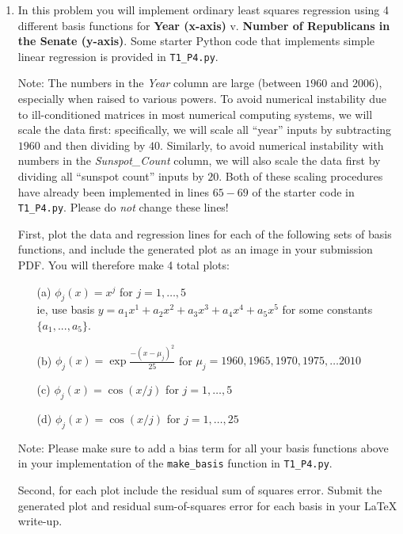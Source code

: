 \documentclass[submit]{harvardml}
\begin{document}
\begin{problem}
\begin{enumerate}
\item In this problem you will implement ordinary least squares
  regression using 4 different basis functions for \textbf{Year
    (x-axis)} v. \textbf{Number of Republicans in the Senate
    (y-axis)}. Some starter Python code that implements simple linear
  regression is provided in \verb|T1_P4.py|.

  Note: The numbers in the \emph{Year} column are large (between $1960$ and $2006$), especially when raised to various powers. To avoid numerical instability due to ill-conditioned matrices in most numerical computing systems, we will scale the data first: specifically, we will scale all ``year'' inputs by subtracting $1960$ and then dividing by $40$. Similarly, to avoid numerical instability with numbers in the \emph{Sunspot\_Count} column, we will also scale the data first by dividing all ``sunspot count'' inputs by $20$. Both of these scaling procedures have already been implemented in lines $65-69$ of the starter code in \verb|T1_P4.py|. Please do \emph{not} change these lines!

First, plot the data and regression lines for each of the following sets of basis functions, and include
the generated plot as an image in your submission PDF. You will therefore make 4 total plots:
\begin{enumerate}
	\item[(a)] $\phi_j(x) = x^j$ for $j=1, \ldots, 5$\\
    ie, use basis $y = a_1 x^1 + a_2 x^2 + a_3 x^3 + a_4 x^4 + a_5 x^5$ for some constants $\{a_1, ..., a_5\}$. 
    \item[(b)] $\phi_j(x) = \exp{\frac{-(x-\mu_j)^2}{25}}$ for $\mu_j=1960, 1965, 1970, 1975, \ldots 2010$
	\item[(c)] $\phi_j(x) = \cos(x / j)$ for $j=1, \ldots, 5$
	\item[(d)] $\phi_j(x) = \cos(x / j)$ for $j=1, \ldots, 25$
\end{enumerate}
\vspace{-2mm}


{\footnotesize * Note: Please make sure to add a bias term for all your basis functions above in your implementation of the \verb|make_basis| function in \verb|T1_P4.py|.}
  
Second, for each plot include the residual sum of squares error. Submit the generated plot and residual sum-of-squares error for each basis in your LaTeX write-up.
\end{enumerate}

\end{problem}
\end{document}
